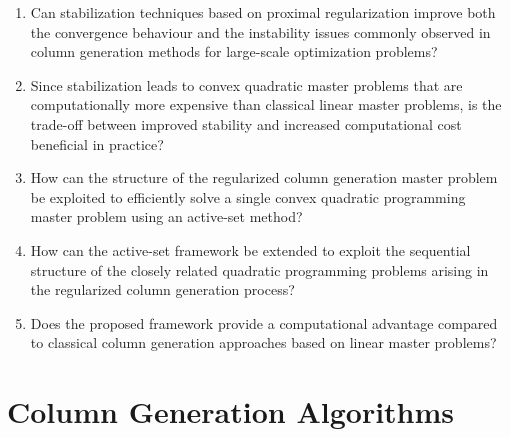\documentclass{book}
\theoremstyle{definition}
\numberwithin{algorithm_}{chapter}
\begin{document}
\begin{enumerate}[label=\textbf{RQ\arabic*}, leftmargin=*, align=left]

\item \label{rq:stability}
Can stabilization techniques based on proximal regularization improve both the convergence behaviour and the instability issues commonly observed in column generation methods for large-scale optimization problems?

\item \label{rq:tradeoff}
Since stabilization leads to convex quadratic master problems that are computationally more expensive than classical linear master problems, is the trade-off between improved stability and increased computational cost beneficial in practice?

\item \label{rq:single_qp}
How can the structure of the regularized column generation master problem be exploited to efficiently solve a single convex quadratic programming master problem using an active-set method?

\item \label{rq:sequence}
How can the active-set framework be extended to exploit the sequential structure of the closely related quadratic programming problems arising in the regularized column generation process?

\item \label{rq:performance}
Does the proposed framework provide a computational advantage compared to classical column generation approaches based on linear master problems?

\end{enumerate}
























\newpage

\chapter{Column Generation Algorithms}
\label{chap:column_generation}


\vspace*{\fill}
\end{document}
